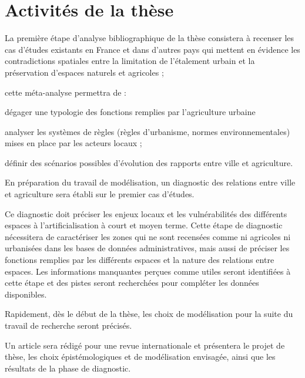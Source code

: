 \section[planning]{Activités de la thèse}

\subject{1ère année}

\startitemize[n]

\item	La première étape d'analyse bibliographique de la thèse
	consistera à recenser les cas d'études existants en France et dans d'autres pays
	qui mettent en évidence les contradictions spatiales entre la limitation de l'étalement urbain
	et la préservation d'espaces naturels et agricoles ;

	cette méta-analyse permettra de :

	\startitemize[a,packed]

	\item dégager une typologie des fonctions remplies par l'agriculture urbaine
	\item analyser les systèmes de règles (règles d'urbanisme,
		normes environnementales) mises en place par les acteurs locaux ;
		\item définir des scénarios possibles d'évolution
	  des rapports entre ville et agriculture.

	\stopitemize

\item	En préparation du travail de modélisation,
	un diagnostic des relations entre ville et agriculture
	sera établi sur le premier cas d'études.

	Ce diagnostic doit préciser les enjeux locaux
	et les vulnérabilités des différents espaces
	à l'artificialisation à court et moyen terme.
	Cette étape de diagnostic nécessitera de caractériser les zones
	qui ne sont recensées comme ni agricoles ni urbanisées
	dans les bases de données administratives,
	mais aussi de préciser les fonctions remplies par les différents espaces
	et la nature des relations entre espaces.
	Les informations manquantes perçues comme utiles
	seront identifiées à cette étape et des pistes seront recherchées
	pour compléter les données disponibles.

\item Rapidement, dès le début de la thèse,
	les choix de modélisation pour la suite du travail de recherche
	seront précisés.

\item Un article sera rédigé pour une revue internationale
   et présentera le projet de thèse,
   les choix épistémologiques et de modélisation envisagée,
   ainsi que les résultats de la phase de diagnostic.

